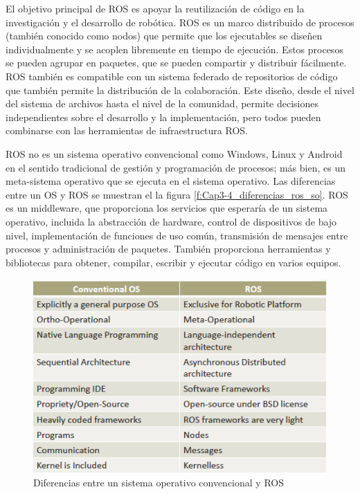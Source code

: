       El objetivo principal de ROS es apoyar la reutilización de código en la investigación y el desarrollo de robótica. ROS es un marco distribuido de procesos (también conocido como nodos) que permite que los ejecutables se diseñen individualmente y se acoplen libremente en tiempo de ejecución. Estos procesos se pueden agrupar en paquetes, que se pueden compartir y distribuir fácilmente. ROS también es compatible con un sistema federado de repositorios de código que también permite la distribución de la colaboración. Este diseño, desde el nivel del sistema de archivos hasta el nivel de la comunidad, permite decisiones independientes sobre el desarrollo y la implementación, pero todos pueden combinarse con las herramientas de infraestructura ROS.
       
       ROS no es un sistema operativo convencional como Windows, Linux y Android en el sentido tradicional de gestión y programación de procesos; más bien, es un meta-sistema operativo que se ejecuta en el sistema operativo. Las diferencias entre un OS y ROS se muestran el la figura \eqref{f:Cap3-4_diferencias_ros_so}. ROS es un middleware, que proporciona los servicios que esperaría de un sistema operativo, incluida la abstracción de hardware, control de dispositivos de bajo nivel, implementación de funciones de uso común, transmisión de mensajes entre procesos y administración de paquetes. También proporciona herramientas y bibliotecas para obtener, compilar, escribir y ejecutar código en varios equipos.
       
        \begin{figure}[htb]
            \centering
            \includegraphics[width=0.65\linewidth]{Main/Chapter3/Images3/3-4/diferencia-ROS-SO.png}
            \caption{Diferencias entre un sistema operativo convencional y ROS}
            \label{f:Cap3-4_diferencias_ros_so}
        \end{figure}
        
        \newpage
        
